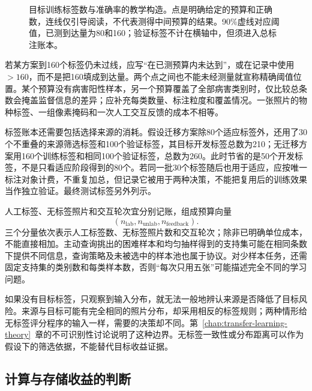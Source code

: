 \begin{figure}[htbp]
  \centering
  
  \caption{目标训练标签数与准确率的教学构造。点是明确给定的预算和正确数，连线仅引导阅读，不代表测得中间预算的结果。90\%虚线对应阈值，已测到达量为80和160；验证标签不计在横轴中，但须进入总标注账本。}
  \label{fig:ket-reuse-learning-curves}
\end{figure}

若某方案到160个标签仍未过线，应写“在已测预算内未达到”，或在记录中使用$>160$，而不是把160填成到达量。两个点之间也不能未经测量就宣称精确阈值位置。某个预算没有病害阳性样本，另一个预算覆盖了全部病害类别时，仅比较总条数会掩盖监督信息的差异；应补充每类数量、标注粒度和覆盖情况。一张照片的物种标签、一组像素掩码和一次人工交互反馈的成本不相等。

\begin{samepage}
标签账本还需要包括选择来源的消耗。假设迁移方案除80个适应标签外，还用了30个不重叠的来源筛选标签和100个验证标签，其目标开发标签总数为210；无迁移方案用160个训练标签和相同100个验证标签，总数为260。此时节省的是50个开发标签，不是只看适应阶段得到的80个。若同一批30个标签随后也用于适应，应按唯一标注对象计费，不重复加总，但记录它被用于两种决策，不能把复用后的训练效果当作独立验证。最终测试标签另外列示。

\end{samepage}

人工标签、无标签照片和交互轮次宜分别记账，组成预算向量
\[
  (n_{\mathrm{lab}},n_{\mathrm{unlab}},n_{\mathrm{feedback}}).
\]
三个分量依次表示人工标签数、无标签照片数和交互轮次；除非已明确单位成本，不能直接相加。主动查询挑出的困难样本和均匀抽样得到的支持集可能在相同条数下提供不同信息，查询策略及未被选中的样本池也属于协议。对少样本任务，还需固定支持集的类别数和每类样本数，否则“每次只用五张”可能描述完全不同的学习问题。

如果没有目标标签，只观察到输入分布，就无法一般地辨认来源是否降低了目标风险。来源与目标可能有完全相同的照片分布，却采用相反的标签规则；两种情形给无标签评分程序的输入一样，需要的决策却不同。第~\ref{chap:transfer-learning-theory}~章的不可识别性讨论说明了这种边界。无标签一致性或分布距离可以作为假设下的筛选依据，不能替代目标收益证据。

\subsection{计算与存储收益的判断}
\label{sec:ket-reuse-resource-benefits}

